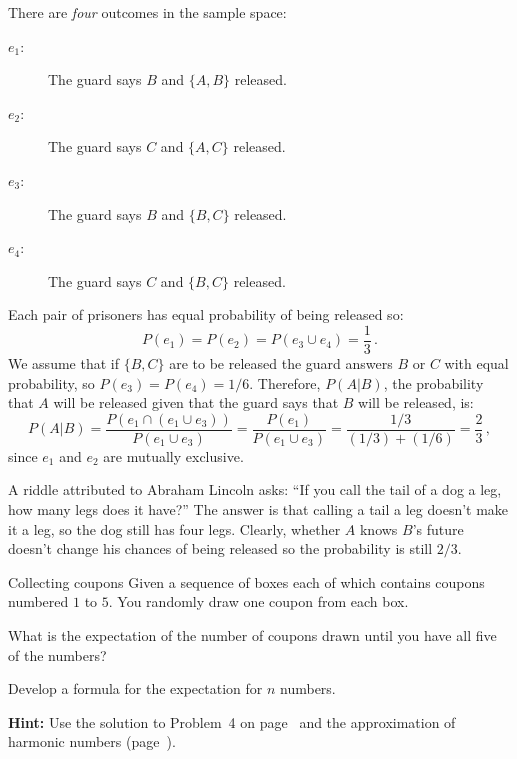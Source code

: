 There are \emph{four} outcomes in the sample space:
\begin{description}
\item[$e_1$:] The guard says $B$ and $\{A,B\}$ released. 
\item[$e_2$:] The guard says $C$ and $\{A,C\}$ released. 
\item[$e_3$:] The guard says $B$ and $\{B,C\}$ released.
\item[$e_4$:] The guard says $C$ and $\{B,C\}$ released. 
\end{description}
Each pair of prisoners has equal probability of being released so:
\[
P(e_1)=P(e_2)=P(e_3\cup e_4)=\frac{1}{3}\,.
\]
We assume that if $\{B,C\}$ are to be released the guard answers $B$ or $C$ with equal probability, so $P(e_3)=P(e_4)=1/6$. Therefore, $P(A|B)$, the probability that $A$ will be released given that the guard says that $B$ will be released, is:
\[
P(A|B) = \frac{P(e_1\cap(e_1\cup e_3))}{P(e_1\cup e_3)}=\frac{P(e_1)}{P(e_1\cup e_3)}=\frac{1/3}{(1/3)+(1/6)}=\frac{2}{3}\,,
\]
since $e_1$ and $e_2$ are mutually exclusive.


A riddle attributed to Abraham Lincoln asks: ``If you call the tail of a dog a leg, how many legs does it have?'' The answer is that calling a tail a leg doesn't make it a leg, so the dog still has four legs. Clearly, whether $A$ knows $B$'s future doesn't change his chances of being released so the probability is still $2/3$.


\begin{prob}{Collecting coupons}
Given a sequence of boxes each of which contains coupons numbered $1$ to $5$. You randomly draw one coupon from each box.

 What is the expectation of the number of coupons drawn until you have all five of the numbers?

 Develop a formula for the expectation for $n$ numbers.

\textbf{Hint:} Use the solution to Problem~4 on page~\pageref{p.four} and the approximation of harmonic numbers (page~\pageref{p.harmonic}).
\end{prob}

\solution{}

